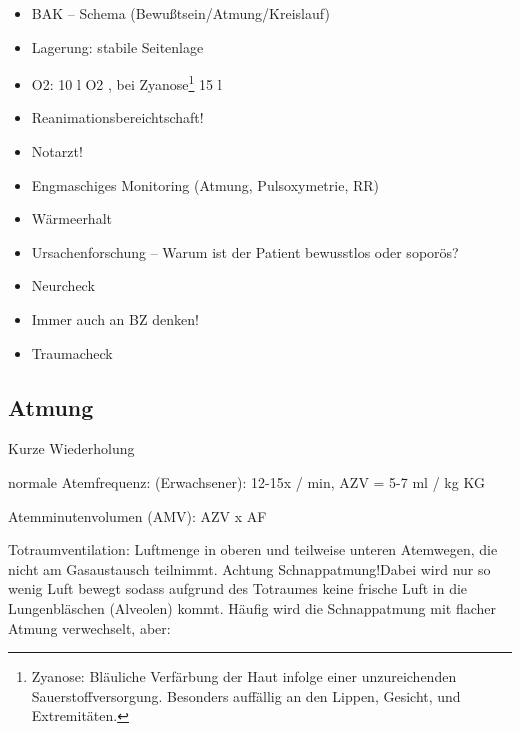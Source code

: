 \documentclass{article}
\begin{document}
\begin{itemize}
\item BAK -- Schema  (Bewu{\ss}tsein/Atmung/Kreislauf)

\item Lagerung: stabile Seitenlage

\item O2:  10 l  O2 , bei Zyanose\footnote{Zyanose: Bl\"auliche
Verf\"arbung der Haut infolge einer unzureichenden
Sauerstoffversorgung. Besonders auff\"allig an den Lippen, Gesicht, und
Extremit\"aten.}  15 l

\item Reanimationsbereichtschaft!

\item Notarzt! 

\item Engmaschiges Monitoring (Atmung, Pulsoxymetrie, RR)

\item W\"armeerhalt

\item Ursachenforschung -- Warum ist der Patient bewusstlos oder
sopor\"os?

\item Neurcheck

\end{itemize}
\begin{itemize}
\item Immer auch an BZ denken!

\end{itemize}
\begin{itemize}
\item Traumacheck

\end{itemize}
\subsection{Atmung}
Kurze Wiederholung

normale Atemfrequenz: (Erwachsener): 12-15x / min, AZV = 5-7 ml / kg KG

Atemminutenvolumen (AMV): AZV x AF

Totraumventilation: Luftmenge in oberen  und
teilweise unteren Atemwegen, die  nicht am Gasaustausch teilnimmt.
Achtung Schnappatmung!Dabei wird nur so wenig Luft
bewegt sodass aufgrund des Totraumes keine frische Luft in die
Lungenbl\"aschen (Alveolen) kommt. H\"aufig wird die Schnappatmung mit
flacher Atmung verwechselt, aber:
\end{document}
